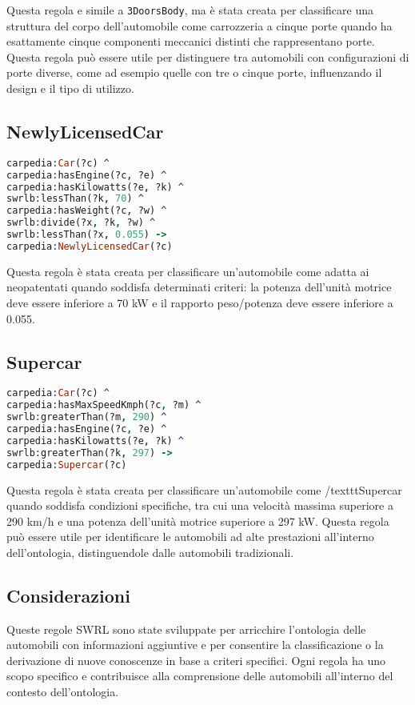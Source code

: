 Questa regola e simile a \texttt{3DoorsBody}, ma è stata creata per classificare una struttura del corpo dell'automobile come carrozzeria a cinque porte quando ha esattamente cinque componenti meccanici distinti che rappresentano porte.
Questa regola può essere utile per distinguere tra automobili con configurazioni di porte diverse,
come ad esempio quelle con tre o cinque porte, influenzando il design e il tipo di utilizzo.

\subsection{NewlyLicensedCar}

\begin{lstlisting}[language=Prolog]
carpedia:Car(?c) ^
carpedia:hasEngine(?c, ?e) ^
carpedia:hasKilowatts(?e, ?k) ^
swrlb:lessThan(?k, 70) ^
carpedia:hasWeight(?c, ?w) ^
swrlb:divide(?x, ?k, ?w) ^
swrlb:lessThan(?x, 0.055) ->
carpedia:NewlyLicensedCar(?c)
\end{lstlisting}


Questa regola è stata creata per classificare un'automobile come adatta ai neopatentati quando soddisfa
determinati criteri: la potenza dell'unità motrice deve essere inferiore a 70 kW e il rapporto peso/potenza
deve essere inferiore a 0.055.

\subsection{Supercar}

\begin{lstlisting}[language=Prolog]
carpedia:Car(?c) ^
carpedia:hasMaxSpeedKmph(?c, ?m) ^
swrlb:greaterThan(?m, 290) ^
carpedia:hasEngine(?c, ?e) ^
carpedia:hasKilowatts(?e, ?k) ^
swrlb:greaterThan(?k, 297) ->
carpedia:Supercar(?c)
\end{lstlisting}


Questa regola è stata creata per classificare un'automobile come /texttt{Supercar} quando soddisfa condizioni
specifiche, tra cui una velocità massima superiore a 290 km/h e una potenza dell'unità motrice superiore a 297 kW.
Questa regola può essere utile per identificare le automobili ad alte prestazioni all'interno dell'ontologia,
distinguendole dalle automobili tradizionali.

\subsection{Considerazioni}
Queste regole SWRL sono state sviluppate per arricchire l'ontologia delle automobili con informazioni
aggiuntive e per consentire la classificazione o la derivazione di nuove conoscenze in base a criteri specifici.
Ogni regola ha uno scopo specifico e contribuisce alla comprensione delle automobili all'interno del contesto
dell'ontologia.


